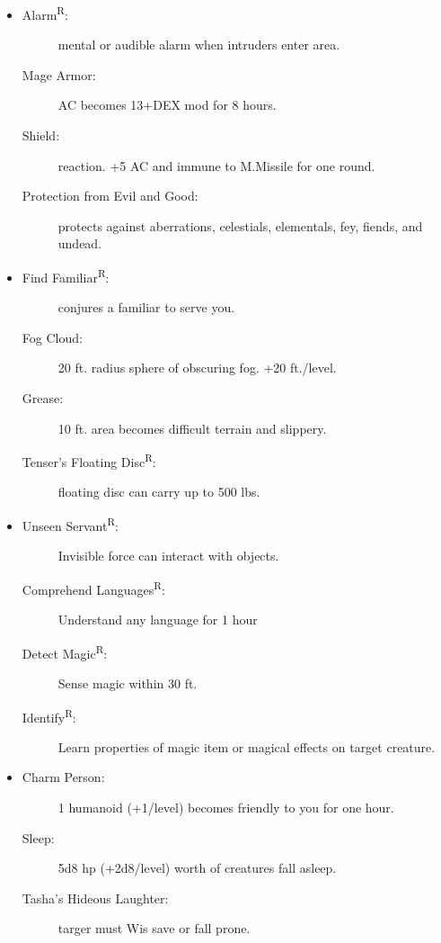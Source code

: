 \documentclass[DIV=14, paper=a4, fontsize=12pt, twocolumn, twoside]{scrartcl}
\begin{document}
\begin{itemize}[align=parleft,labelwidth=1cm]
	\renewcommand{\labelitemi}{Abjur}\item
	\begin{description}
\item[Alarm\textsuperscript{R}:] mental or audible alarm when intruders enter area.
\item[Mage Armor:] AC becomes 13+DEX mod for 8 hours.
\item[Shield:] reaction. +5 AC and immune to M.Missile for one round.
\item[Protection from Evil and Good:] protects against aberrations, celestials, elementals, fey, fiends, and undead.
	\end{description}
	\renewcommand{\labelitemi}{Conj}\item
	\begin{description}
\item[Find Familiar\textsuperscript{R}:] conjures a familiar to serve you.
\item[Fog Cloud:] 20 ft. radius sphere of obscuring fog. +20 ft./level.
\item[Grease:] 10 ft. area becomes difficult terrain and slippery.
\item[Tenser’s Floating Disc\textsuperscript{R}:] floating disc can carry up to 500 lbs.
	\end{description}
	\renewcommand{\labelitemi}{Div}\item
	\begin{description}
\item[Unseen Servant\textsuperscript{R}:] Invisible force can interact with objects.
\item[Comprehend Languages\textsuperscript{R}:] Understand any language for 1 hour
\item[Detect Magic\textsuperscript{R}:] Sense magic within 30 ft.
\item[Identify\textsuperscript{R}:] Learn properties of magic item or magical effects on
target creature.	
	\end{description}
	\renewcommand{\labelitemi}{Ench}\item
	\begin{description}
\item[Charm Person:] 1 humanoid (+1/level) becomes friendly to you
for one hour.
\item[Sleep:] 5d8 hp (+2d8/level) worth of creatures fall asleep.
\item[Tasha’s Hideous Laughter:] targer must Wis save or fall prone.

\end{description}
\end{itemize}
\end{document}
